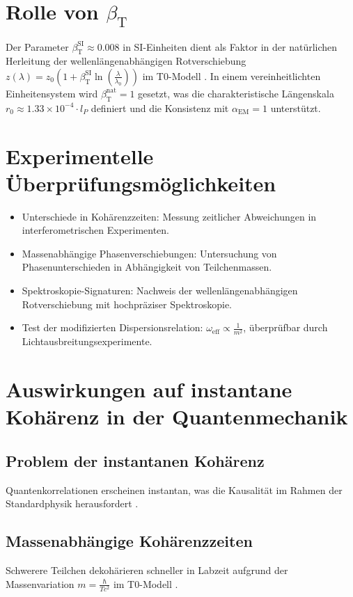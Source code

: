 \documentclass[12pt,a4paper]{article}
\newcommand{\betaT}{\beta_{\text{T}}}
\newcommand{\alphaEM}{\alpha_{\text{EM}}}
\begin{document}
	\section{Rolle von \(\betaT\)}
	Der Parameter \(\betaT^{\text{SI}} \approx 0.008\) in SI-Einheiten dient als Faktor in der natürlichen Herleitung der wellenlängenabhängigen Rotverschiebung \( z(\lambda) = z_0 \left(1 + \betaT^{\text{SI}} \ln\left(\frac{\lambda}{\lambda_0}\right)\right) \) im T0-Modell \cite{pascher_alphabeta_2025}. In einem vereinheitlichten Einheitensystem wird \(\betaT^{\text{nat}} = 1\) gesetzt, was die charakteristische Längenskala \( r_0 \approx 1.33 \times 10^{-4} \cdot l_P \) definiert und die Konsistenz mit \(\alphaEM = 1\) unterstützt.
	
	\section{Experimentelle Überprüfungsmöglichkeiten}
	\begin{itemize}
		\item Unterschiede in Kohärenzzeiten: Messung zeitlicher Abweichungen in interferometrischen Experimenten.
		\item Massenabhängige Phasenverschiebungen: Untersuchung von Phasenunterschieden in Abhängigkeit von Teilchenmassen.
		\item Spektroskopie-Signaturen: Nachweis der wellenlängenabhängigen Rotverschiebung mit hochpräziser Spektroskopie.
		\item Test der modifizierten Dispersionsrelation: \( \omega_{\text{eff}} \propto \frac{1}{m^2} \), überprüfbar durch Lichtausbreitungsexperimente.
	\end{itemize}
	
	\section{Auswirkungen auf instantane Kohärenz in der Quantenmechanik}
	\subsection{Problem der instantanen Kohärenz}
	Quantenkorrelationen erscheinen instantan, was die Kausalität im Rahmen der Standardphysik herausfordert \cite{bell}.
	
	\subsection{Massenabhängige Kohärenzzeiten}
	Schwerere Teilchen dekohärieren schneller in Labzeit aufgrund der Massenvariation \( m = \frac{\hbar}{T c^2} \) im T0-Modell \cite{pascher_galaxies_2025}.
	
\end{document}
